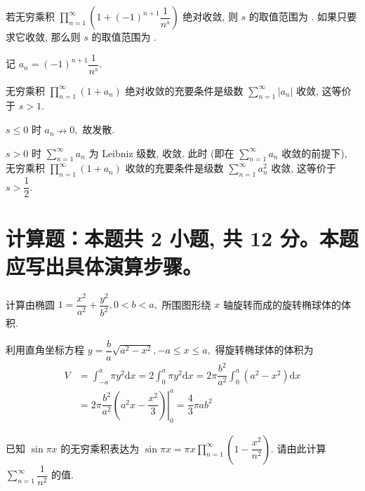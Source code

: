 \begin{question}
  若无穷乘积 $\prod\limits_{n=1}^\infty \left( 1 + (-1)^{n+1} \dfrac{1}{n^s} \right)$ 绝对收敛, 则 $s$ 的取值范围为 \fillin[$s > 1$]. 如果只要求它收敛, 那么则 $s$ 的取值范围为 \fillin[$s > \dfrac{1}{2}$].
\end{question}

\begin{solution}
  记 $a_n = (-1)^{n+1} \dfrac{1}{n^s}.$

  无穷乘积 $\prod\limits_{n=1}^\infty (1 + a_n)$ 绝对收敛的充要条件是级数 $\sum\limits_{n=1}^\infty \lvert a_n \rvert$ 收敛, 这等价于 $s > 1.$

  $s \leqslant 0$ 时 $a_n \nrightarrow 0,$ 故发散.

  $s > 0$ 时 $\sum\limits_{n=1}^\infty a_n$ 为 Leibniz 级数, 收敛. 此时 (即在 $\sum\limits_{n=1}^\infty a_n$ 收敛的前提下), 无穷乘积 $\prod\limits_{n=1}^\infty (1 + a_n)$ 收敛的充要条件是级数 $\sum\limits_{n=1}^\infty a_n^2$ 收敛, 这等价于 $s > \dfrac{1}{2}.$
\end{solution}

\section{计算题：本题共 2 小题, 共 12 分。本题应写出具体演算步骤。}


\begin{question}[points = 6]
  计算由椭圆 $1 = \dfrac{x^2}{a^2} + \dfrac{y^2}{b^2}, 0 < b < a,$ 所围图形绕 $x$ 轴旋转而成的旋转椭球体的体积.

\end{question}

\begin{solution}
  利用直角坐标方程 $y = \dfrac{b}{a} \sqrt{a^2 - x^2}, -a \leqslant x \leqslant a,$ 得旋转椭球体的体积为
  \begin{align*}
    V & = \int_{-a}^a \pi y^2 \mathrm{d} x = 2 \int_0^a \pi y^2 \mathrm{d} x = 2 \pi \dfrac{b^2}{a^2} \int_0^a (a^2 - x^2) \mathrm{d} x \\
    & = 2 \pi \dfrac{b^2}{a^2} \left. \left( a^2x - \dfrac{x^2}{3} \right) \right|_0^a = \dfrac{4}{3} \pi ab^2
  \end{align*}
\end{solution}

\begin{question}[points = 6]
  已知 $\sin \pi x$ 的无穷乘积表达为 $\sin \pi x = \pi x \prod\limits_{n=1}^{\infty} \left( 1 - \dfrac{x^2}{n^2} \right).$ 请由此计算 $\sum\limits_{n=1}^{\infty} \dfrac{1}{n^2}$ 的值.

\end{question}

